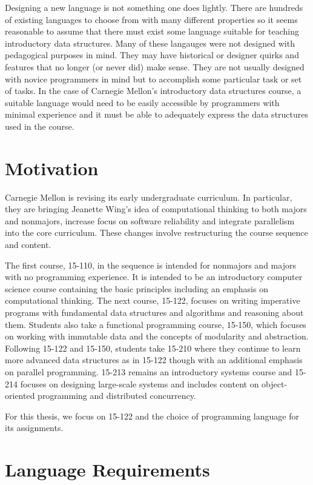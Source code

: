 Designing a new language is not something one does lightly. There are hundreds
of existing languages to choose from with many different properties so it seems
reasonable to assume that there must exist some language suitable for teaching
introductory data structures. Many of these langauges were not designed with
pedagogical purposes in mind. They may have historical or designer quirks and
features that no longer (or never did) make sense. They are not usually designed
with novice programmers in mind but to accomplish some particular task or set of
tasks. In the case of Carnegie Mellon's introductory data structures course, a
suitable language would need to be easily accessible by programmers with
minimal experience and it must be able to adequately express the data
structures used in the course.

\section{Motivation}

Carnegie Mellon is revising its early undergraduate curriculum. In particular,
they are bringing Jeanette Wing's \cite{Henderson2007Computational} idea of
computational thinking to both majors and nonmajors, increase focus on software
reliability and integrate parallelism into the core curriculum. These changes
involve restructuring the course sequence and content.

The first course, 15-110, in the sequence is intended for nonmajors and majors
with no programming experience. It is intended to be an introductory computer
science course containing the basic principles including an emphasis on
computational thinking.  The next course, 15-122, focuses on writing imperative
programs with fundamental data structures and algorithms and reasoning about
them. Students also take a functional programming course, 15-150, which focuses
on working with immutable data and the concepts of modularity and abstraction.
Following 15-122 and 15-150, students take 15-210 where they continue to learn
more advanced data structures as in 15-122 though with an additional emphasis
on parallel programming. 15-213 remains an introductory systems course and
15-214 focuses on designing large-scale systems and includes content on
object-oriented programming and distributed concurrency.

For this thesis, we focus on 15-122 and the choice of programming language for
its assignments.

\section{Language Requirements}

